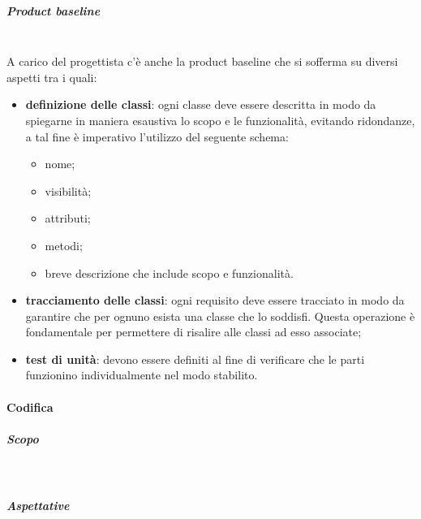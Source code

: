 			\subparagraph*{Product baseline} \mbox{}\\
	
			\noindent A carico del progettista c'è anche la product baseline che si sofferma su diversi aspetti tra i quali:
			\begin{itemize}
				\item \textbf{definizione delle classi}: ogni classe deve essere descritta 
					in modo da spiegarne in maniera esaustiva lo scopo e le funzionalità, evitando 
					ridondanze, a tal fine è imperativo l'utilizzo del seguente 
					schema:
					\begin{itemize}
						\item nome;
						\item visibilità;
						\item attributi;
						\item metodi;
						\item breve descrizione che include scopo e 
						funzionalità.
					\end{itemize}
				\item \textbf{tracciamento delle classi}: ogni requisito deve essere 
					tracciato in modo da garantire che per ognuno esista una classe che lo soddisfi. 
					Questa operazione è fondamentale per permettere di risalire alle classi ad esso 
					associate;
				\item \textbf{test di unità}: devono essere definiti al fine di verificare 
					che le parti funzionino individualmente nel modo stabilito.
			\end{itemize}
				
		\paragraph{Codifica} 
			\subparagraph*{Scopo} \mbox{}\\
	
			 \newline
						
			\subparagraph*{Aspettative} \mbox{}\\
			
			 \newline 
			

